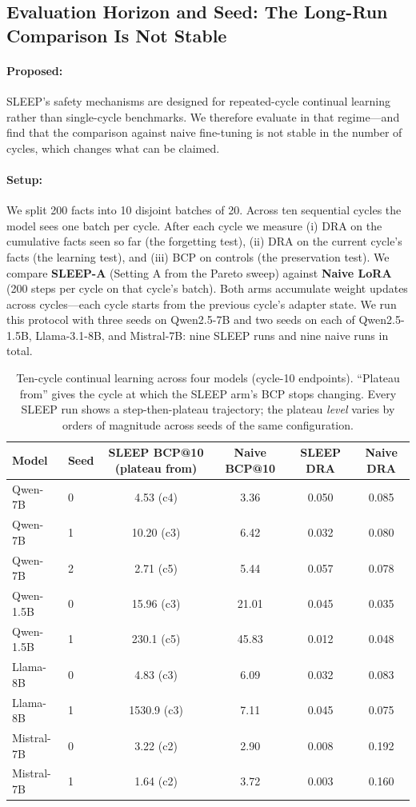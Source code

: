 \subsection{Evaluation Horizon and Seed: The Long-Run Comparison Is Not Stable}
\label{sec:multi_cycle}

\paragraph{Proposed:} SLEEP's safety mechanisms are designed for repeated-cycle continual learning rather than single-cycle benchmarks. We therefore evaluate in that regime---and find that the comparison against naive fine-tuning is not stable in the number of cycles, which changes what can be claimed.

\paragraph{Setup:} We split 200 facts into 10 disjoint batches of 20. Across ten sequential cycles the model sees one batch per cycle. After each cycle we measure (i) DRA on the cumulative facts seen so far (the forgetting test), (ii) DRA on the current cycle's facts (the learning test), and (iii) BCP on controls (the preservation test). We compare \textbf{SLEEP-A} (Setting A from the Pareto sweep) against \textbf{Naive LoRA} (200 steps per cycle on that cycle's batch). Both arms accumulate weight updates across cycles---each cycle starts from the previous cycle's adapter state. We run this protocol with three seeds on Qwen2.5-7B and two seeds on each of Qwen2.5-1.5B, Llama-3.1-8B, and Mistral-7B: nine SLEEP runs and nine naive runs in total.

\begin{table}[t]
\centering
\caption{Ten-cycle continual learning across four models (cycle-10 endpoints). ``Plateau from'' gives the cycle at which the SLEEP arm's BCP stops changing. Every SLEEP run shows a step-then-plateau trajectory; the plateau \emph{level} varies by orders of magnitude across seeds of the same configuration.}
\label{tab:multi_cycle}
\begin{tabular}{llcccc}
\toprule
Model & Seed & SLEEP BCP@10 (plateau from) & Naive BCP@10 & SLEEP DRA & Naive DRA \\
\midrule
Qwen-7B   & 0 & 4.53 (c4)   & 3.36 & 0.050 & 0.085 \\
Qwen-7B   & 1 & 10.20 (c3)  & 6.42 & 0.032 & 0.080 \\
Qwen-7B   & 2 & 2.71 (c5)   & 5.44 & 0.057 & 0.078 \\
Qwen-1.5B & 0 & 15.96 (c3)  & 21.01 & 0.045 & 0.035 \\
Qwen-1.5B & 1 & 230.1 (c5)  & 45.83 & 0.012 & 0.048 \\
Llama-8B  & 0 & 4.83 (c3)   & 6.09 & 0.032 & 0.083 \\
Llama-8B  & 1 & 1530.9 (c3) & 7.11 & 0.045 & 0.075 \\
Mistral-7B & 0 & 3.22 (c2)  & 2.90 & 0.008 & 0.192 \\
Mistral-7B & 1 & 1.64 (c2)  & 3.72 & 0.003 & 0.160 \\
\bottomrule
\end{tabular}
\end{table}


